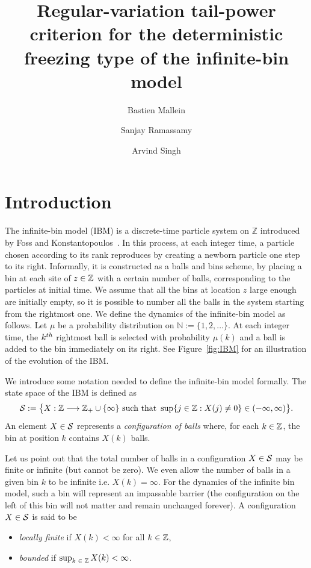 \documentclass[10pt]{amsart}
\theoremstyle{definition}\newtheorem{defi}[theo]{Definition}\newtheorem{rema}[theo]{Remark}\newtheorem{exam}[theo]{Example}\newtheorem{exem}[theo]{Example}\newtheorem{nota}[theo]{Notation}
\newcommand{\bbN}{\mathbb{N}}
\newcommand{\Z}{\mathbb{Z}}
\renewcommand{\S}{\mathcal{S}}
\let\oldin\in
\renewcommand{\in}{\mathchoice{\oldin}{\oldin}{\,\oldin\,}{\,\oldin\,}}
\renewcommand*{\to}{\mathchoice{\longrightarrow}{\rightarrow}{\rightarrow}{\rightarrow}}
\begin{document}
\title{Regular-variation tail-power criterion for the deterministic freezing type of the infinite-bin model}
\author{Bastien Mallein \and Sanjay Ramassamy \and Arvind Singh}
\maketitle
\section{Introduction}\label{sec:introduction}

The infinite-bin model (IBM) is a discrete-time particle system on $\Z$ introduced by Foss and Konstantopoulos~\cite{FK}. In this process, at each integer time, a particle chosen according to its rank reproduces by creating a newborn particle one step to its right. Informally, it is constructed as a balls and bins scheme, by placing a bin at each site of $z\in\Z$ with a certain number of balls, corresponding to the particles at initial time. We assume that all the bins at location $z$ large enough are initially empty, so it is possible to number all the balls in the system starting from the rightmost one. We define the dynamics of the infinite-bin model as follows. Let $\mu$ be a probability distribution on $\bbN
:= \{1,2,\ldots\}$. At each integer time, the $k^{\rm th}$ rightmost ball is selected with probability $\mu(k)$ and a ball is added to the bin immediately on its right. See Figure~\ref{fig:IBM} for an illustration of the evolution of the IBM.

We introduce some notation needed to define the infinite-bin model formally. The state space of the IBM is defined as
\[
\S
:= \bigl\{ X : \Z \to \Z_+\cup \{\infty\} \text{ such that } \sup\{ j \in \Z : X(j) \neq 0 \} \in (-\infty,\infty) \bigr\}.
\]
An element $X\in \S$ represents a \emph{configuration of balls} where, for each $k \in \Z$, the bin at position $k$ contains $X(k)$ balls.

Let us point out that the total number of balls in a configuration $X \in \S$ may be finite or infinite (but cannot be zero). We even allow the number of balls in a given bin $k$ to be infinite i.e. $ X(k) = \infty$. For the dynamics of the infinite bin model, such a bin will represent an impassable barrier (the configuration on the left of this bin will not matter and remain unchanged forever). A configuration $X \in \S$ is said to be
\begin{itemize}
\item \emph{locally finite} if $X(k) < \infty$ for all $k\in \Z$,
\item \emph{bounded} if $\sup_{k\in \Z} X(k) < \infty$.
\end{itemize}
\end{document}
